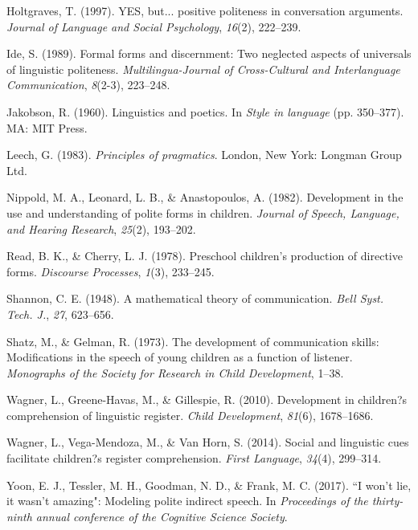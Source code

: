 \documentclass[10pt, letterpaper]{article}
\begin{document}
\hypertarget{ref-holtgraves1997}{}
Holtgraves, T. (1997). YES, but... positive politeness in conversation
arguments. \emph{Journal of Language and Social Psychology},
\emph{16}(2), 222--239.

\hypertarget{ref-ide1989}{}
Ide, S. (1989). Formal forms and discernment: Two neglected aspects of
universals of linguistic politeness. \emph{Multilingua-Journal of
Cross-Cultural and Interlanguage Communication}, \emph{8}(2-3),
223--248.

\hypertarget{ref-jakobson1960}{}
Jakobson, R. (1960). Linguistics and poetics. In \emph{Style in
language} (pp. 350--377). MA: MIT Press.

\hypertarget{ref-leech1983}{}
Leech, G. (1983). \emph{Principles of pragmatics}. London, New York:
Longman Group Ltd.

\hypertarget{ref-nippold1982}{}
Nippold, M. A., Leonard, L. B., \& Anastopoulos, A. (1982). Development
in the use and understanding of polite forms in children. \emph{Journal
of Speech, Language, and Hearing Research}, \emph{25}(2), 193--202.

\hypertarget{ref-read1978}{}
Read, B. K., \& Cherry, L. J. (1978). Preschool children's production of
directive forms. \emph{Discourse Processes}, \emph{1}(3), 233--245.

\hypertarget{ref-shannon1948}{}
Shannon, C. E. (1948). A mathematical theory of communication.
\emph{Bell Syst. Tech. J.}, \emph{27}, 623--656.

\hypertarget{ref-shatz1973}{}
Shatz, M., \& Gelman, R. (1973). The development of communication
skills: Modifications in the speech of young children as a function of
listener. \emph{Monographs of the Society for Research in Child
Development}, 1--38.

\hypertarget{ref-wagner2010}{}
Wagner, L., Greene-Havas, M., \& Gillespie, R. (2010). Development in
children?s comprehension of linguistic register. \emph{Child
Development}, \emph{81}(6), 1678--1686.

\hypertarget{ref-wagner2014}{}
Wagner, L., Vega-Mendoza, M., \& Van Horn, S. (2014). Social and
linguistic cues facilitate children?s register comprehension.
\emph{First Language}, \emph{34}(4), 299--314.

\hypertarget{ref-yoon2017}{}
Yoon, E. J., Tessler, M. H., Goodman, N. D., \& Frank, M. C. (2017). ``I
won't lie, it wasn't amazing": Modeling polite indirect speech. In
\emph{Proceedings of the thirty-ninth annual conference of the Cognitive
Science Society}.


\end{document}
